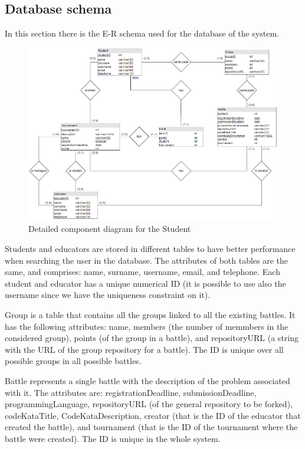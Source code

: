 \documentclass[12pt, a4paper]{report}
\begin{document}
    \newpage
    \subsection{Database schema}
    In this section there is the E-R schema used for the database of the system. 
    \begin{figure}[H]
        \centering
        \includegraphics[width=0.9\linewidth]{images/db.png}
        \caption{Detailed component diagram for the Student}
    \end{figure}
    Students and educators are stored in different tables to have better performance when searching the user in the database.
    The attributes of both tables are the same, and comprises: name, surname, username, email, and telephone. 
    Each student and educator has a unique numerical ID (it is possible to use also the username since we have the uniqueness constraint on it). 

    Group is a table that contains all the groups linked to all the existing battles. 
    It has the following attributes: name, members (the number of memmbers in the considered group), points (of the group in a battle), and repositoryURL (a string with the URL of the group repository for a battle).
    The ID is unique over all possible groups in all possible battles.
    
    Battle represents a single battle with the description of the problem associated with it. 
    The attributes are: registrationDeadline, submissionDeadline, programmingLanguage, repositoryURL (of the general repository to be forked), codeKataTitle, CodeKataDescription, creator (that is the ID of the educator that created the battle), and tournament (that is the ID of the tournament where the battle were created). 
    The ID is unique in the whole system. 
\end{document}
